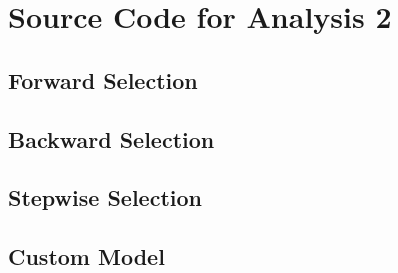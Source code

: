 \documentclass[11pt]{scrartcl} %
\begin{document}

\pagebreak

\section{Source Code for Analysis 2}
\label{sec:Analysis2}

\subsection{Forward Selection}


\subsection{Backward Selection}


\subsection{Stepwise Selection}
	

\subsection{Custom Model}
	
\pagebreak
\end{document}
